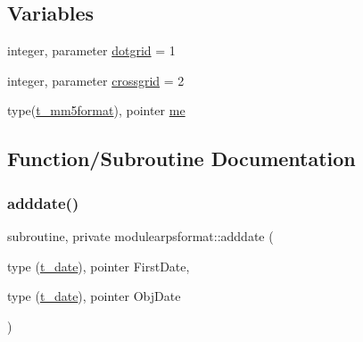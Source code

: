 \subsection*{Variables}
\begin{DoxyCompactItemize}
\item 
integer, parameter \mbox{\hyperlink{namespacemodulearpsformat_adad659745a61e1b477c5b8218c0a518b}{dotgrid}} = 1
\item 
integer, parameter \mbox{\hyperlink{namespacemodulearpsformat_a481f4077f9a97ca259535ae7940a069d}{crossgrid}} = 2
\item 
type(\mbox{\hyperlink{structmodulearpsformat_1_1t__mm5format}{t\+\_\+mm5format}}), pointer \mbox{\hyperlink{namespacemodulearpsformat_aa48b8d20bd8a9748703bc70c33e5bce9}{me}}
\end{DoxyCompactItemize}


\subsection{Function/\+Subroutine Documentation}
\mbox{\label{namespacemodulearpsformat_a3e7adeca2b8b386d9c8d59f32a8c189f}} 
\subsubsection{\texorpdfstring{adddate()}{adddate()}}
{\footnotesize\ttfamily subroutine, private modulearpsformat\+::adddate (\begin{DoxyParamCaption}\item[{type (\mbox{\hyperlink{structmodulearpsformat_1_1t__date}{t\+\_\+date}}), pointer}]{First\+Date,  }\item[{type (\mbox{\hyperlink{structmodulearpsformat_1_1t__date}{t\+\_\+date}}), pointer}]{Obj\+Date }\end{DoxyParamCaption})\hspace{0.3cm}{\ttfamily [private]}}

